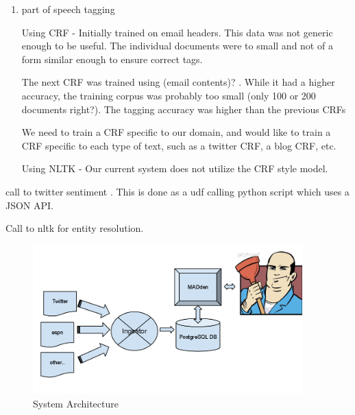 \documentclass{article}
\begin{document}
\begin{enumerate}
\begin{enumerate}
\begin{enumerate}
\begin{enumerate}
        

      \item part of speech tagging
        
        
        
        Using CRF -
        Initially trained on email headers. 
        This data was not generic enough to be useful.
        The individual documents were to small and not of a form similar enough to ensure correct tags.
        
        The next CRF was trained using (email contents)? .
        While it had a higher accuracy, the training corpus was probably too small (only 100 or 200 documents right?). 
        The tagging accuracy was higher than the previous CRFs

        We need to train a CRF specific to our domain,
        and would like to train a CRF specific to each type of text,
        such as a twitter CRF, a blog CRF, etc.

        Using NLTK -
        Our current system does not utilize the CRF style model.

      \end{enumerate}


      

      

      call to twitter sentiment . This is done as a udf calling python script which uses a JSON API.

      Call to nltk for entity resolution.

      \begin{figure}
        \begin{center}
          \includegraphics[width=104mm]{architecture-1.png}
          \caption{System Architecture}
          \label{fig:architecture}
        \end{center}
      \end{figure}


\end{enumerate}
\end{enumerate}
\end{enumerate}
\end{document}
